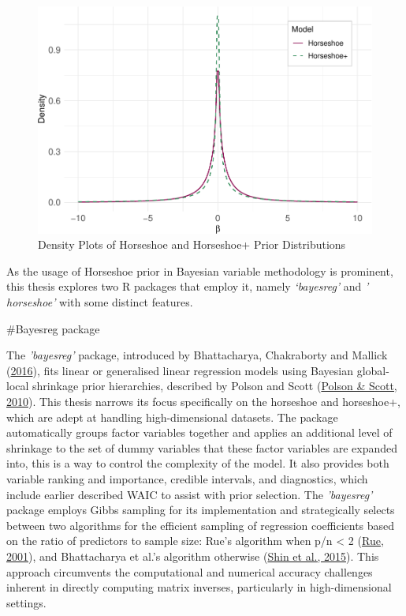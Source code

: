 \documentclass[
  11pt,
]{article}
\begin{document}
\begin{figure}

{\centering \includegraphics[width=0.75\linewidth]{dissertation_files/figure-latex/Horseshoe Plus Priors-1} 

}

\caption{Density Plots of Horseshoe and Horseshoe+ Prior Distributions}\label{fig:Horseshoe Plus Priors}
\end{figure}

As the usage of Horseshoe prior in Bayesian variable methodology is
prominent, this thesis explores two R packages that employ it, namely
\emph{`bayesreg'} and \emph{' horseshoe'} with some distinct features.

\#Bayesreg package

The \emph{'bayesreg'} package, introduced by Bhattacharya, Chakraborty
and Mallick (\protect\hyperlink{ref-Bhattacharya2016}{2016}), fits
linear or generalised linear regression models using Bayesian
global-local shrinkage prior hierarchies, described by Polson and Scott
(\protect\hyperlink{ref-Polson2010}{Polson \& Scott, 2010}). This thesis
narrows its focus specifically on the horseshoe and horseshoe+, which
are adept at handling high-dimensional datasets. The package
automatically groups factor variables together and applies an additional
level of shrinkage to the set of dummy variables that these factor
variables are expanded into, this is a way to control the complexity of
the model. It also provides both variable ranking and importance,
credible intervals, and diagnostics, which include earlier described
WAIC to assist with prior selection. The \emph{'bayesreg'} package
employs Gibbs sampling for its implementation and strategically selects
between two algorithms for the efficient sampling of regression
coefficients based on the ratio of predictors to sample size: Rue's
algorithm when p/n \textless{} 2 (\protect\hyperlink{ref-Rue2001}{Rue,
2001}), and Bhattacharya et al.'s algorithm otherwise
(\protect\hyperlink{ref-Shin2015}{Shin et al., 2015}). This approach
circumvents the computational and numerical accuracy challenges inherent
in directly computing matrix inverses, particularly in high-dimensional
settings.
\end{document}

